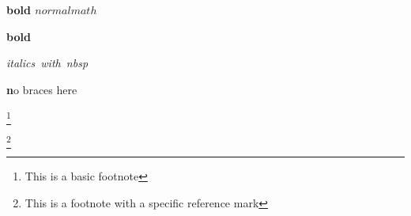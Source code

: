 \documentclass[12pt]{article}
\newcommand\"{quote}
\begin{document}
\textbf{bold $normal math$}

\textbf{bold %
}

\textit{italics~with~nbsp}

\textbf no braces here


\footnote{This is a basic footnote}

\footnote [ 5 ] {This is a footnote with a specific reference mark}


\footnotemark

\footnotemark  [ 1   ]
\end{document}
